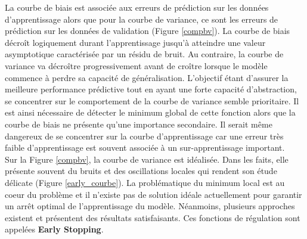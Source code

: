 \noindent La courbe de biais est associée aux erreurs de prédiction sur les données d'apprentissage alors que pour la courbe de variance, ce sont les erreurs de prédiction sur les données de validation (Figure \ref{compbv}). La courbe de biais décroît logiquement durant l'apprentissage jusqu'à atteindre une valeur asymptotique caractérisée par un résidu de bruit. Au contraire, la courbe de variance va décroître progressivement avant de croître lorsque le modèle commence à perdre sa capacité de généralisation. L'objectif étant d'assurer la meilleure performance prédictive tout en ayant une forte capacité d'abstraction, se concentrer sur le comportement de la courbe de variance semble prioritaire. Il est ainsi nécessaire de détecter le minimum global de cette fonction alors que la courbe de biais ne présente qu'une importance secondaire. Il serait même dangereux de se concentrer sur la courbe d'apprentissage car une erreur très faible d'apprentissage est souvent associée à un sur-apprentissage important.\\

\noindent Sur la Figure \ref{compbv}, la courbe de variance est idéalisée. Dans les faits, elle présente souvent du bruits et des oscillations locales qui rendent son étude délicate (Figure \ref{early_courbe}). La problématique du minimum local est au coeur du problème et il n'existe pas de solution idéale actuellement pour garantir un arrêt optimal de l'apprentissage du modèle. Néanmoins, plusieurs approches existent et présentent des résultats satisfaisants. Ces fonctions de régulation sont appelées \textbf{Early Stopping}.

